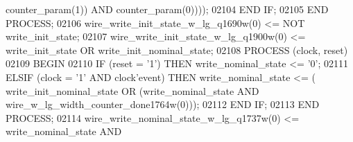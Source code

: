 \begin{DoxyCode}
{{      counter_param}\textcolor{vhdlchar}{(}\textcolor{vhdllogic}{}\textcolor{vhdllogic}{1}\textcolor{vhdlchar}{)}\textcolor{vhdlchar}{)} \textcolor{keywordflow}{AND} \textcolor{vhdlchar}{counter_param}\textcolor{vhdlchar}{(}\textcolor{vhdllogic}{}\textcolor{vhdllogic}{0}\textcolor{vhdlchar}{)}\textcolor{vhdlchar}{)}\textcolor{vhdlchar}{)}\textcolor{vhdlchar}{)};
02104         \textcolor{keywordflow}{END} \textcolor{keywordflow}{IF};
02105     \textcolor{keywordflow}{END} \textcolor{keywordflow}{PROCESS};
02106     \textcolor{vhdlchar}{wire_write_init_state_w_lg_q1690w}\textcolor{vhdlchar}{(}\textcolor{vhdllogic}{}\textcolor{vhdllogic}{0}\textcolor{vhdlchar}{)} \textcolor{vhdlchar}{<=} \textcolor{keywordflow}{NOT} \textcolor{vhdlchar}{write_init_state};
02107     \textcolor{vhdlchar}{wire_write_init_state_w_lg_q1900w}\textcolor{vhdlchar}{(}\textcolor{vhdllogic}{}\textcolor{vhdllogic}{0}\textcolor{vhdlchar}{)} \textcolor{vhdlchar}{<=} \textcolor{vhdlchar}{write_init_state} \textcolor{keywordflow}{OR} \textcolor{vhdlchar}{
      write_init_nominal_state};
02108     \textcolor{keywordflow}{PROCESS} (clock, reset)
02109 \textcolor{vhdlkeyword}{    BEGIN}
02110         \textcolor{keywordflow}{IF} \textcolor{vhdlchar}{(}\textcolor{vhdlchar}{reset} \textcolor{vhdlchar}{=} \textcolor{vhdlchar}{'}\textcolor{vhdllogic}{}\textcolor{vhdllogic}{1}\textcolor{vhdlchar}{'}\textcolor{vhdlchar}{)} \textcolor{keywordflow}{THEN} \textcolor{vhdlchar}{write_nominal_state} \textcolor{vhdlchar}{<=} \textcolor{vhdlchar}{'}\textcolor{vhdllogic}{}\textcolor{vhdllogic}{0}\textcolor{vhdlchar}{'};
02111         \textcolor{keywordflow}{ELSIF} \textcolor{vhdlchar}{(}\textcolor{vhdlchar}{clock} \textcolor{vhdlchar}{=} \textcolor{vhdlchar}{'}\textcolor{vhdllogic}{}\textcolor{vhdllogic}{1}\textcolor{vhdlchar}{'} \textcolor{keywordflow}{AND} \textcolor{vhdlchar}{clock}\textcolor{vhdlchar}{'}\textcolor{vhdlkeyword}{event}\textcolor{vhdlchar}{)} \textcolor{keywordflow}{THEN} \textcolor{vhdlchar}{write_nominal_state} \textcolor{vhdlchar}{<=} \textcolor{vhdlchar}{(}\textcolor{vhdlchar}{
      write_init_nominal_state} \textcolor{keywordflow}{OR} \textcolor{vhdlchar}{(}\textcolor{vhdlchar}{write_nominal_state} \textcolor{keywordflow}{AND} \textcolor{vhdlchar}{
      wire_w_lg_width_counter_done1764w}\textcolor{vhdlchar}{(}\textcolor{vhdllogic}{}\textcolor{vhdllogic}{0}\textcolor{vhdlchar}{)}\textcolor{vhdlchar}{)}\textcolor{vhdlchar}{)};
02112         \textcolor{keywordflow}{END} \textcolor{keywordflow}{IF};
02113     \textcolor{keywordflow}{END} \textcolor{keywordflow}{PROCESS};
02114     \textcolor{vhdlchar}{wire_write_nominal_state_w_lg_q1737w}\textcolor{vhdlchar}{(}\textcolor{vhdllogic}{}\textcolor{vhdllogic}{0}\textcolor{vhdlchar}{)} \textcolor{vhdlchar}{<=} \textcolor{vhdlchar}{write_nominal_state} \textcolor{keywordflow}{AND} \textcolor{vhdlchar}{
}}
\end{DoxyCode}

